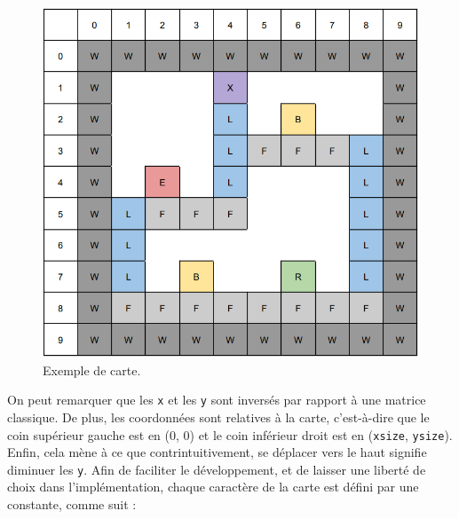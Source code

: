 \begin{figure}[!htpb]
    \centering
    \includegraphics[width=\linewidth]{Figures/map1.png}
    \caption[Exemple de carte.]{Exemple de carte.}
    \label{fig:map1}
\end{figure}

\newpage

On peut remarquer que les \texttt{x} et les \texttt{y} sont inversés par rapport à une matrice classique.
De plus, les coordonnées sont relatives à la carte, c'est-à-dire que le coin supérieur gauche est en (0, 0) et le coin inférieur droit est en (\texttt{xsize}, \texttt{ysize}).
Enfin, cela mène à ce que contrintuitivement, se déplacer vers le haut signifie diminuer les \texttt{y}.
\newline\newline
Afin de faciliter le développement, et de laisser une liberté de choix dans l'implémentation, chaque caractère de la carte est défini par une constante, comme suit :

